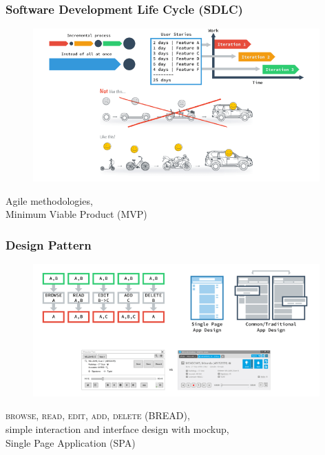\documentclass[10pt, compress]{beamer}
\begin{document}
\begin{frame}[fragile]
  \frametitle{Software Development Life Cycle (SDLC)}
  \centering

  \begin{figure}[ht]
    \vspace{-1cm}
    \includegraphics[width=11cm]{include/literature-sdlc.png}
  \end{figure}

  \alert{Agile} methodologies,\\
  Minimum Viable Product (\alert{MVP})\\

\end{frame}


\begin{frame}[fragile]
  \frametitle{Design Pattern}
  \centering

  \begin{figure}[ht]
    \vspace{-1cm}
    \includegraphics[width=11cm]{include/literature-design-pattern.png}
  \end{figure}

  \textsc{browse, read, edit, add, delete} (\alert{BREAD}),\\
  simple interaction and interface design with \alert{mockup},\\
  Single Page Application (\alert{SPA})

\end{frame}
\end{document}
